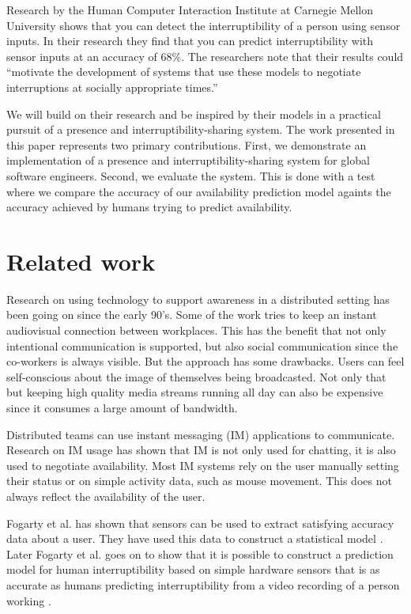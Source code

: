\documentclass{sigchi}
\begin{document}
Research by the Human Computer Interaction Institute at Carnegie Mellon University \cite{fogarty2005predicting} shows that you can detect the interruptibility of a person using sensor inputs.
In their research they find that you can predict interruptibility with sensor inputs at an accuracy of 68\%.
The researchers note that their results could ``motivate the development of systems that use these models to negotiate interruptions at socially appropriate times.''

We will build on their research and be inspired by their models in a practical pursuit of a presence and interruptibility-sharing system.
The work presented in this paper represents two primary contributions.
First, we demonstrate an implementation of a presence and interruptibility-sharing system for global software engineers.
Second, we evaluate the system.
This is done with a test where we compare the accuracy of our availability prediction model againts the accuracy achieved by humans trying to predict availability.

\section{Related work}
Research on using technology to support awareness in a distributed setting has been going on since the early 90’s.
Some of the work \cite{bly1993media} \cite{gaver1992realizing} \cite{mantei1991experiences} tries to keep an instant audiovisual connection between workplaces.
This has the benefit that not only intentional communication is supported, but also social communication since the co-workers is always visible.
But the approach has some drawbacks.
Users can feel self-conscious about the image of themselves being broadcasted.
Not only that but keeping high quality media streams running all day can also be expensive since it consumes a large amount of bandwidth.

Distributed teams can use instant messaging (IM) applications to communicate.
Research on IM usage \cite{nardi2000interaction} \cite{handel2002chat} \cite{tang2001connexus} has shown that IM is not only used for chatting, it is also used to negotiate availability.
Most IM systems rely on the user manually setting their status or on simple activity data, such as mouse movement.
This does not always reflect the availability of the user.

Fogarty et al. has shown that sensors can be used to extract satisfying accuracy data about a user.
They have used this data to construct a statistical model \cite{fogarty2004examining}.
Later Fogarty et al. goes on to show that it is possible to construct a prediction model for human interruptibility based on simple hardware sensors that is as accurate as humans predicting interruptibility from a video recording of a person working \cite{fogarty2005predicting}.
\end{document}
